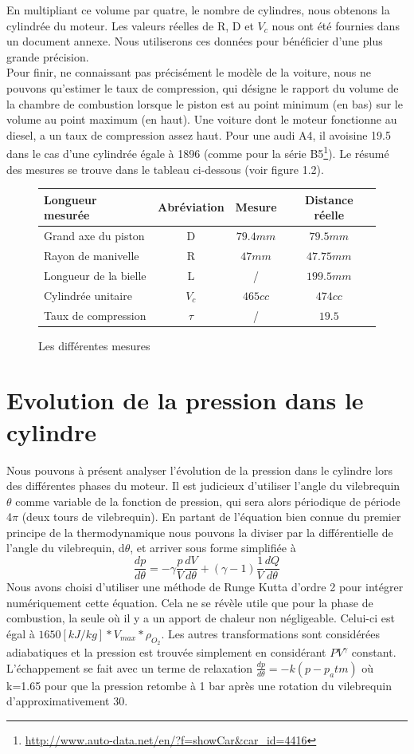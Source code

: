 \documentclass[a4paper,oneside,12pt]{report}
\begin{document}
En multipliant ce volume par quatre, le nombre de cylindres, nous obtenons la cylindrée du moteur. Les valeurs réelles de R, D et $V_c$ nous ont été fournies dans un document annexe. Nous utiliserons ces données pour bénéficier d'une plus grande précision.\\

Pour finir, ne connaissant pas précisément le modèle de la voiture, nous ne pouvons qu'estimer le taux de compression, qui désigne le rapport du volume de la chambre de combustion lorsque le piston est au point minimum (en bas) sur le volume au point maximum (en haut). Une voiture dont le moteur fonctionne au diesel, a un taux de compression assez haut. Pour une audi A4, il avoisine 19.5 dans le cas d'une cylindrée égale à 1896 (comme pour la série
B5\footnote{\url{http://www.auto-data.net/en/?f=showCar&car_id=4416}}). Le résumé des mesures se trouve dans le tableau ci-dessous (voir figure 1.2).

\begin{figure}[h]
\centering
\begin{tabular}{|l|c|c|c|}
  \hline
  Longueur mesurée & Abréviation & Mesure & Distance réelle\\
  \hline
  Grand axe du piston & D & $79.4mm$ & $79.5mm$ \\
  Rayon de manivelle & R & $47mm$ & $47.75mm$\\
  Longueur de la bielle & L & / & $199.5mm$\\
  Cylindrée unitaire & $V_c$  & $465cc$ & $474cc$\\
  Taux de compression & $\tau$ & / & $19.5$\\
  \hline
\end{tabular}
\caption{Les différentes mesures}
\end{figure}

\section{Evolution de la pression dans le cylindre}

Nous pouvons à présent analyser l'évolution de la pression dans le cylindre lors des différentes phases du moteur. Il est judicieux d'utiliser l'angle du vilebrequin $\theta$ comme variable de la fonction de pression, qui sera alors périodique de période 4$\pi$ (deux tours de vilebrequin). En partant de l'équation bien connue du premier principe de la thermodynamique nous pouvons la diviser par la différentielle de l'angle du vilebrequin, d$\theta$, et arriver sous forme simplifiée à
$$\frac{dp}{d\theta}=-\gamma\frac{p}{V}\frac{dV}{d\theta}+(\gamma - 1) \frac{1}{V}\frac{dQ}{d\theta}$$
Nous avons choisi d'utiliser une méthode de Runge Kutta d'ordre 2 pour intégrer numériquement cette équation. Cela ne se révèle utile que pour la phase de combustion, la seule où il y a un apport de chaleur non négligeable. Celui-ci est égal à $1650[kJ/kg] * V_{max} * \rho_{O_2}$. Les autres transformations sont considérées adiabatiques et la pression est trouvée simplement en considérant $PV^{\gamma}$ constant. L'échappement se fait avec un terme de relaxation $\frac{dp}{d\theta}=-k(p-p_atm)$ où k=1.65 pour que la pression retombe à 1 bar après une rotation du vilebrequin d'approximativement 30\degre.
\end{document}
